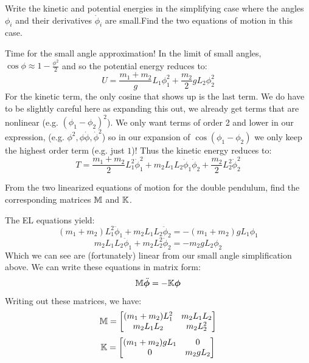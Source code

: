 \documentclass[../PHYS306Notes.tex]{subfiles}
\begin{document}
\begin{p}
Write the kinetic and potential energies in the simplifying case where the angles $\phi_i$ and their derivatives $\dot{\phi}_i$ are small.Find the two equations of motion in this case. 
\end{p}
\begin{s}
Time for the small angle approximation! In the limit of small angles, $\cos\phi \approx 1 - \frac{\phi^2}{2}$ and so the potential energy reduces to:
\[U = \frac{m_1 + m_2}gL_1\phi_1^2 + \frac{m_2}{2}gL_2\phi^2_2\]
For the kinetic term, the only cosine that shows up is the last term. We do have to be slightly careful here as expanding this out, we already get terms that are nonlinear (e.g. $(\phi_1 - \phi_2)^2$). We only want terms of order 2 and lower in our expression, (e.g. $\phi^2, \phi\dot{\phi}, \dot{\phi}^2$) so in our expansion of $\cos(\phi_1 - \phi_2)$ we only keep the highest order term (e.g. just $1$)! Thus the kinetic energy reduces to:
\[T = \frac{m_1 + m_2}{2}L_1^2\dot{\phi}_1^2 + m_2L_1L_2\dot{\phi}_1\dot{\phi}_2 + \frac{m_2}{2}L_2^2\dot{\phi}_2^2\]
\end{s}

\begin{p}
From the two linearized equations of motion for the double pendulum, find the corresponding matrices $\mathbb{M}$ and $\mathbb{K}$.
\end{p}
\begin{s}
The EL equations yield:
\[(m_1 + m_2)L_1^2\ddot{\phi}_1 + m_2L_1L_2\ddot{\phi}_2 = -(m_1 + m_2)gL_1\phi_1\]
\[m_2L_1L_2\ddot{\phi}_1 + m_2L_2^2\ddot{\phi}_2 = -m_2gL_2\phi_2\]
Which we can see are (fortunately) linear from our small angle simplification above. We can write these equations in matrix form:
\[\mathbb{M}\ddot{\bm{\phi}} = -\mathbb{K}\bm{\phi}\]
Writing out these matrices, we have:
\[\mathbb{M} = \begin{bmatrix}
(m_1 + m_2)L_1^2 & m_2L_1L_2
\\ m_2L_1L_2 & m_2L_2^2\end{bmatrix}\]
\[\mathbb{K} = \begin{bmatrix}(m_1 + m_2)gL_1 & 0 
\\ 0 & m_2gL_2\end{bmatrix}\]

\end{s}
\end{document}
